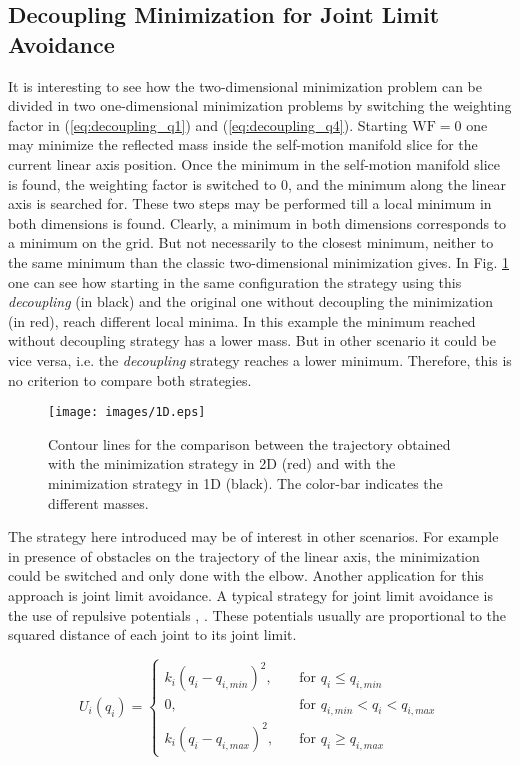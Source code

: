 \subsection{Decoupling Minimization for Joint Limit Avoidance}
\label{subsec:wf_JLA}

It is interesting to see how the two-dimensional minimization problem can be divided in two one-dimensional minimization problems by switching the weighting factor in (\ref{eq:decoupling_q1}) and (\ref{eq:decoupling_q4}). Starting  $\mathrm{WF  = 0}$  one may minimize the reflected mass inside the self-motion manifold slice for the current linear axis position. Once the minimum in the self-motion manifold slice is found, the weighting factor is switched to $0$, and the minimum along the linear axis is searched for. These two steps may be performed till a local minimum in both dimensions is found. 
Clearly, a minimum in both dimensions corresponds to a minimum on the grid. But not necessarily to the closest minimum, neither to the same minimum than the classic two-dimensional minimization gives. In  Fig. \ref{fig:1D} one can see how starting in the same configuration the strategy using this \textit{decoupling} (in black) and the original one without decoupling the minimization (in red), reach different local minima. In this example the minimum reached without decoupling strategy has a lower mass. But in other scenario it could be vice versa, i.e. the \textit{decoupling}  strategy reaches a lower minimum. 	Therefore, this is no criterion to compare both strategies.
%
\begin{figure}[!htb]
	\centerline{
		\texttt{[image: images/1D.eps]}}
	\caption{Contour lines for the comparison between the trajectory obtained with the minimization strategy in 2D (red) and with the minimization strategy in 1D (black). The color-bar indicates the different masses.}
	\label{fig:1D}
\end{figure} 
%
The strategy here introduced may be of interest in other scenarios. For example in presence of obstacles on the trajectory of the linear axis, the minimization could be switched and only done with the elbow.
Another application for this approach is joint limit avoidance.
A typical strategy for joint limit avoidance is the use of repulsive potentials \cite{JLA_3}, \cite{JLA_4}. These potentials usually are proportional to the squared distance of each joint to its joint limit. 

\begin{equation} 
U_i(q_i) = 
\begin{cases}
k_{i} (q_{i} - q_{i,min})^{2}, &\quad\text{for \ }  q_i\le q_{i,min}\\
\text{0}, &\quad\text{for \ } q_{i,min} < q_i < q_{i,max}\\
k_{i} (q_{i} - q_{i,max})^{2}, &\quad\text{for \ }  q_i\ge q_{i,max}	
\end{cases}
\label{eq:JLA_dietrich}
\end{equation}



